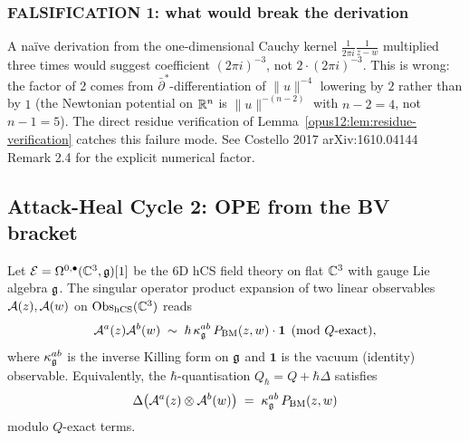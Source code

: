 \subsubsection{FALSIFICATION 1: what would break the derivation}

\begin{proposition}
\label{opus12:prop:falsify-bm}
A na\"ive derivation from the one-dimensional Cauchy kernel
$\frac{1}{2\pi i}\frac{1}{z - w}$ multiplied three times would
suggest coefficient $(2\pi i)^{-3}$, not $2 \cdot (2\pi i)^{-3}$.
This is wrong: the factor of 2 comes from $\bar\partial^*$-differentiation
of $\|u\|^{-4}$ lowering by $2$ rather than by $1$ (the Newtonian
potential on $\mathbb{R}^n$ is $\|u\|^{-(n-2)}$ with $n - 2 = 4$, not $n - 1 = 5$).
The direct residue verification of
Lemma~\ref{opus12:lem:residue-verification} catches this failure
mode. See Costello 2017 arXiv:1610.04144 Remark 2.4 for the
explicit numerical factor.
\end{proposition}

\subsection{Attack-Heal Cycle 2: OPE from the BV bracket}
\label{opus12:sec:cycle2-ope}

\begin{center}
\end{center}

\begin{theorem}\ClaimStatusTheorem
\label{opus12:thm:ope}
Let $\mathcal{E} = \Omega^{0,\bullet}(\mathbb{C}^3, \mathfrak{g})[1]$ be the 6D hCS field
theory on flat $\mathbb{C}^3$ with gauge Lie algebra $\mathfrak{g}$. The singular
operator product expansion of two linear observables
$\mathcal{A}(z), \mathcal{A}(w)$ on $\mathrm{Obs}_{\mathrm{hCS}}(\mathbb{C}^3)$ reads
\[
\mathcal{A}^a(z) \mathcal{A}^b(w) \;\sim\;
\hbar \, \kappa_{\mathfrak{g}}^{ab} \, P_{\mathrm{BM}}(z, w) \cdot \mathbf{1}
\pmod{Q\text{-exact}},
\]
where $\kappa_{\mathfrak{g}}^{ab}$ is the inverse Killing form on $\mathfrak{g}$ and
$\mathbf{1}$ is the vacuum (identity) observable. Equivalently, the
$\hbar$-quantisation $Q_\hbar = Q + \hbar \Delta$ satisfies
\[
\Delta \bigl(\mathcal{A}^a(z) \otimes \mathcal{A}^b(w)\bigr) \;=\;
\kappa_{\mathfrak{g}}^{ab} \, P_{\mathrm{BM}}(z, w)
\]
modulo $Q$-exact terms.
\end{theorem}

